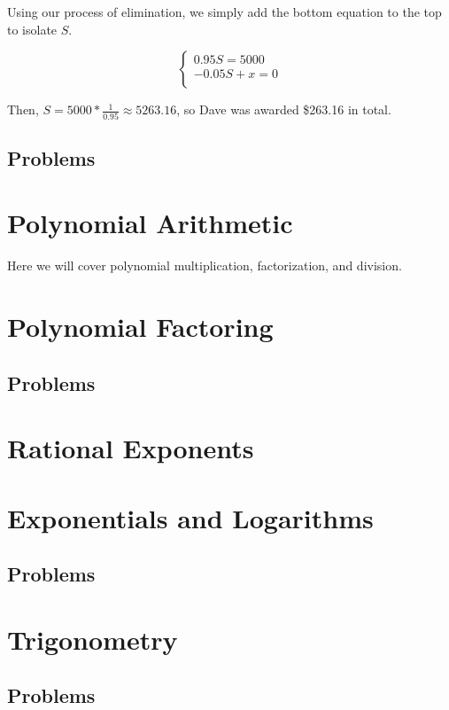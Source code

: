 \documentclass{scrbook}
\theoremstyle{definition}
\begin{document}
Using our process of elimination, we simply add the bottom equation to the top to isolate $S$. 

\[
  \begin{cases}
    0.95S = 5000\\
    -0.05S + x = 0\\
  \end{cases}
\]

Then, $S = 5000 * \frac{1}{0.95} \approx 5263.16$, so Dave was awarded \$263.16 in total.  

\subsection{Problems}



\section{Polynomial Arithmetic}

Here we will cover polynomial multiplication, factorization, and division.

\section{Polynomial Factoring}

\subsection{Problems}

\section{Rational Exponents}

\section{Exponentials and Logarithms}

\subsection{Problems}

\section{Trigonometry}

\subsection{Problems}

\printbibliography
\end{document}
